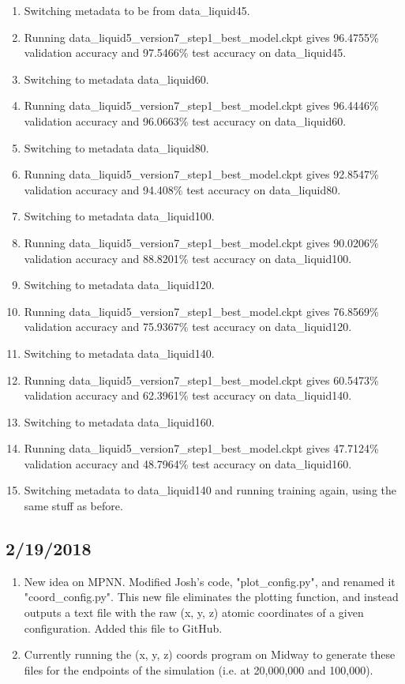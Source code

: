 \documentclass[12pt,reqno]{amsart}
\numberwithin{equation}{section}
\begin{document}
\begin{enumerate}
\item Switching metadata to be from data\_liquid45.  
\item Running data\_liquid5\_version7\_step1\_best\_model.ckpt gives 96.4755\% validation accuracy and 97.5466\% test accuracy on data\_liquid45.
\item Switching to metadata data\_liquid60.  
\item Running data\_liquid5\_version7\_step1\_best\_model.ckpt gives 96.4446\% validation accuracy and 96.0663\% test accuracy on data\_liquid60.
\item Switching to metadata data\_liquid80.  
\item Running data\_liquid5\_version7\_step1\_best\_model.ckpt gives 92.8547\% validation accuracy and 94.408\% test accuracy on data\_liquid80.
\item Switching to metadata data\_liquid100.  
\item Running data\_liquid5\_version7\_step1\_best\_model.ckpt gives 90.0206\% validation accuracy and 88.8201\% test accuracy on data\_liquid100.
\item Switching to metadata data\_liquid120.  
\item Running data\_liquid5\_version7\_step1\_best\_model.ckpt gives 76.8569\% validation accuracy and 75.9367\% test accuracy on data\_liquid120.
\item Switching to metadata data\_liquid140. 
\item Running data\_liquid5\_version7\_step1\_best\_model.ckpt gives 60.5473\% validation accuracy and 62.3961\% test accuracy on data\_liquid140.
\item Switching to metadata data\_liquid160. 
\item Running data\_liquid5\_version7\_step1\_best\_model.ckpt gives 47.7124\% validation accuracy and 48.7964\% test accuracy on data\_liquid160.
\item Switching metadata to data\_liquid140 and running training again, using the same stuff as before. 
\end{enumerate}

\subsection{2/19/2018}

\begin{enumerate}
\item New idea on MPNN.  Modified Josh's code, "plot\_config.py", and renamed it "coord\_config.py".  This new file eliminates the plotting function, and instead outputs a text file with the raw (x, y, z) atomic coordinates of a given configuration.  Added this file to GitHub.
\item Currently running the (x, y, z) coords program on Midway to generate these files for the endpoints of the simulation (i.e. at 20,000,000 and 100,000).  
\end{enumerate}
\end{document}
